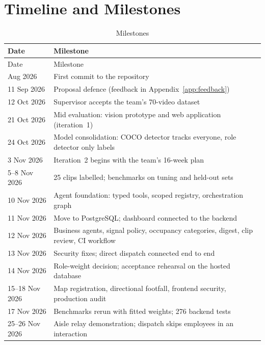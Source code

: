 \section{Timeline and Milestones}
\begin{longtable}{P{0.2\textwidth}P{0.72\textwidth}}
\caption{Milestones}\label{tab:milestones}\\
\toprule
Date & Milestone\\
\midrule
\endfirsthead
\toprule
Date & Milestone\\
\midrule
\endhead
\bottomrule
{} Aug 2026 & First commit to the repository\\
11 Sep 2026 & Proposal defence (feedback in Appendix~\ref{app:feedback})\\
12 Oct 2026 & Supervisor accepts the team's 70-video dataset\\
21 Oct 2026 & Mid evaluation: vision prototype and web application (iteration~1)\\
24 Oct 2026 & Model consolidation: COCO detector tracks everyone, role detector only labels\\
3 Nov 2026 & Iteration~2 begins with the team's 16-week plan\\
5--8 Nov 2026 & 25 clips labelled; benchmarks on tuning and held-out sets\\
10 Nov 2026 & Agent foundation: typed tools, scoped registry, orchestration graph\\
11 Nov 2026 & Move to PostgreSQL; dashboard connected to the backend\\
12 Nov 2026 & Business agents, signal policy, occupancy categories, digest, clip review, CI workflow\\
13 Nov 2026 & Security fixes; direct dispatch connected end to end\\
14 Nov 2026 & Role-weight decision; acceptance rehearsal on the hosted database\\
15--18 Nov 2026 & Map registration, directional footfall, frontend security, production audit\\
17 Nov 2026 & Benchmarks rerun with fitted weights; 276 backend tests\\
25--26 Nov 2026 & Aisle relay demonstration; dispatch skips employees in an interaction\\
\end{longtable}

